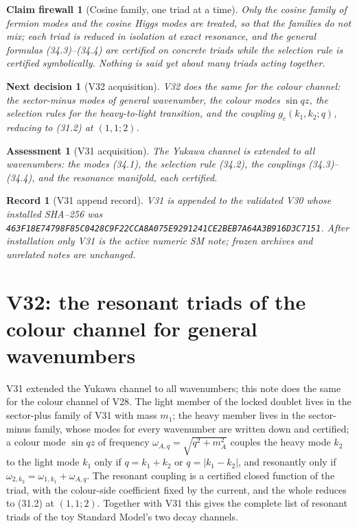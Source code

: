 \documentclass[11pt]{article}
\newtheorem{firewall}[theorem]{Claim firewall}
\newtheorem{decision}[theorem]{Next decision}
\newtheorem{assessment}[theorem]{Assessment}
\newtheorem{record}[theorem]{Record}
\theoremstyle{remark}
\begin{document}
\begin{firewall}[Cosine family, one triad at a time]
\label{fire:v20v31}
Only the cosine family of fermion modes and the cosine Higgs modes
are treated, so that the families do not mix; each triad is reduced
in isolation at exact resonance, and the general formulas (34.3)--(34.4)
are certified on concrete triads while the selection rule is
certified symbolically.  Nothing is said yet about many triads
acting together.
\end{firewall}

\begin{decision}[V32 acquisition]
\label{dec:v20v31-next}
V32 does the same for the colour channel: the sector-minus modes of
general wavenumber, the colour modes \(\sin qz\), the selection rules
for the heavy-to-light transition, and the coupling
\(g_c(k_1,k_2;q)\), reducing to (31.2) at \((1,1;2)\).
\end{decision}

\begin{assessment}[V31 acquisition]
\label{ass:v20v31}
The Yukawa channel is extended to all wavenumbers: the modes (34.1),
the selection rule (34.2), the couplings (34.3)--(34.4), and the
resonance manifold, each certified.
\end{assessment}

\begin{record}[V31 append record]
\label{rec:v20v31}
V31 is appended to the validated V30 whose installed SHA--256 was
\texttt{463F18E74798F85C0428C9F22CCA8A075E9291241CE2BEB7A64A3B916D3C7151}.
After installation only V31 is the active numeric SM note; frozen
archives and unrelated notes are unchanged.
\end{record}


\section{V32: the resonant triads of the colour channel for general wavenumbers}
\label{sec:v20v32}

V31 extended the Yukawa channel to all wavenumbers; this note does
the same for the colour channel of V28.  The light member of the
locked doublet lives in the sector-plus family of V31 with mass
\(m_1\); the heavy member lives in the sector-minus family, whose
modes for every wavenumber are written down and certified; a colour
mode \(\sin qz\) of frequency \(\omega_{A,q}=\sqrt{q^2+m_A^2}\) couples
the heavy mode \(k_2\) to the light mode \(k_1\) only if
\(q=k_1+k_2\) or \(q=|k_1-k_2|\), and resonantly only if
\(\omega_{2,k_2}=\omega_{1,k_1}+\omega_{A,q}\).  The resonant coupling is
a certified closed function of the triad, with the colour-side
coefficient fixed by the current, and the whole reduces to (31.2)
at \((1,1;2)\).  Together with V31 this gives the complete list of
resonant triads of the toy Standard Model's two decay channels.
\end{document}
